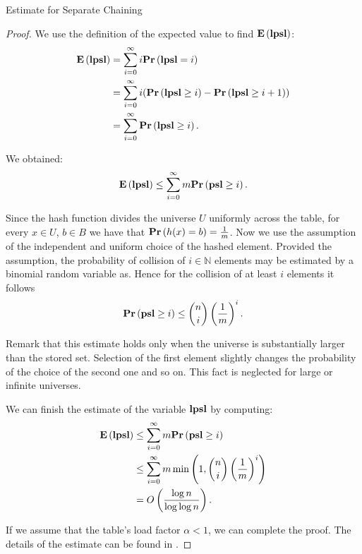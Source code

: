 \begin{section}{Estimate for Separate Chaining}
\begin{proof}
We use the definition of the expected value to find $\mathbf{E}\left(\mathbf{lpsl}\right)$:
\begin{displaymath}
\begin{split}
\mathbf{E}\left(\mathbf{lpsl}\right)
	& = \displaystyle \sum_{i=0}^{\infty} i \mathbf{Pr}\left(\mathbf{lpsl} = i\right) \\
	& = \displaystyle \sum_{i = 0}^{\infty} i (\mathbf{Pr}\left(\mathbf{lpsl} \geq i\right) - \mathbf{Pr}\left(\mathbf{lpsl} \geq i + 1\right)) \\ 
	& = \displaystyle \sum_{i = 0}^{\infty} \mathbf{Pr}\left(\mathbf{lpsl} \geq i\right) \text{.}
\end{split}
\end{displaymath}

We obtained:
\begin{displaymath}
\mathbf{E}\left(\mathbf{lpsl}\right) \leq \displaystyle \sum_{i = 0}^{\infty} m \mathbf{Pr}\left(\mathbf{psl} \geq i\right) \text{.}
\end{displaymath}

Since the hash function divides the universe $U$ uniformly across the table, for every $x \in U$, $b \in B$ we have that $\mathbf{Pr}\left(h(x) = b\right) = \frac{1}{m}$. Now we use the assumption of the independent and uniform choice of the hashed element. Provided the assumption, the probability of collision of $i \in \mathbb{N}$ elements may be estimated by a binomial random variable as. Hence for the collision of at least $i$ elements it follows
\begin{displaymath}
\mathbf{Pr}\left(\mathbf{psl} \geq i\right) \leq \dbinom{n}{i}\left(\frac{1}{m}\right)^i \text{.}
\end{displaymath}

Remark that this estimate holds only when the universe is substantially larger than the stored set. Selection of the first element slightly changes the probability of the choice of the second one and so on. This fact is neglected for large or infinite universes.

We can finish the estimate of the variable $\mathbf{lpsl}$ by computing:
\begin{displaymath}
\begin{split}
\mathbf{E}\left(\mathbf{lpsl}\right)	& \leq \displaystyle \sum_{i = 0}^{\infty} m \mathbf{Pr}\left(\mathbf{psl} \geq i\right) \\
		& \leq \displaystyle \sum_{i = 0}^{\infty} m \min\left(1, \dbinom{n}{i}\left(\frac{1}{m}\right)^i\right) \\
		& = O\left(\frac{\log n}{\log \log n}\right) \text{.}
\end{split}
\end{displaymath}

If we assume that the table's load factor $\alpha < 1$, we can complete the proof. The details of the estimate can be found in \cite{DBLP:books/sp/Mehlhorn84}.
\end{proof}
\end{section}

